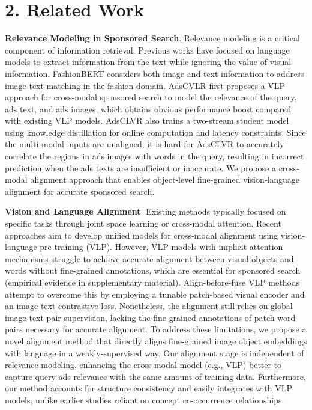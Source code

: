 \documentclass[letterpaper]{article} \usepackage{aaai24}  \usepackage{times}  \usepackage{helvet}  \usepackage{courier}  \usepackage[hyphens]{url}  \usepackage{graphicx} \urlstyle{rm} \def\UrlFont{\rm}  \usepackage{natbib}  \usepackage{caption} \frenchspacing  \setlength{\pdfpagewidth}{8.5in}  \setlength{\pdfpageheight}{11in}
\begin{document}
\section{2. Related Work}

\noindent\textbf{Relevance Modeling in Sponsored Search}. Relevance modeling is a critical component of information retrieval. 
Previous works \cite{grbovic2018real, li2021adsgnn, zhu2021textgnn} have focused on language models to extract information from the text while ignoring the value of visual information. FashionBERT \cite{gao2020fashionbert} considers both image and text information to address image-text matching in the fashion domain. AdsCVLR \cite{10.1145/3503161.3548226} first proposes a VLP approach for cross-modal sponsored search to model the relevance of the query, ads text, and ads images, which obtains obvious performance boost compared with existing VLP models. AdsCLVR also trains a two-stream student model using knowledge distillation for online computation and latency constraints. Since the multi-modal inputs are unaligned, it is hard for AdsCLVR to accurately correlate the regions in ads images with words in the query, resulting in incorrect prediction when the ads texts are insufficient or inaccurate.  We propose a cross-modal alignment approach that enables object-level fine-grained vision-language alignment for accurate sponsored search.

\noindent\textbf{Vision and Language Alignment}. Existing methods \cite{zhen2019deep,gao2020fashionbert,yu2018mattnet, Liu_2019_CVPR,anderson2018bottom} typically focused on specific tasks through joint space learning or cross-modal attention. Recent approaches \cite{su2020vl-bert,li2020oscar,zhang2021vinvl,radford2021learning,yao2022filip} aim to develop unified models for cross-modal alignment using vision-language pre-training (VLP). However, VLP models with implicit attention mechanisms struggle to achieve accurate alignment between visual objects and words without fine-grained annotations, which are essential for sponsored search (empirical evidence in supplementary material). Align-before-fuse VLP methods \cite{NEURIPS2021_50525975, pmlr-v162-li22n} attempt to overcome this by employing a tunable patch-based visual encoder and an image-text contrastive loss. Nonetheless, the alignment still relies on global image-text pair supervision, lacking the fine-grained annotations of patch-word pairs necessary for accurate alignment. To address these limitations, we propose a novel alignment method that directly aligns fine-grained image object embeddings with language in a weakly-supervised way. Our alignment stage is independent of relevance modeling, enhancing the cross-modal model (e.g., VLP) better to capture query-ads relevance with the same amount of training data. Furthermore, our method accounts for structure consistency and easily integrates with VLP models, unlike earlier studies \cite{gupta2019vico, wang2020consensus} reliant on concept co-occurrence relationships.
\end{document}
